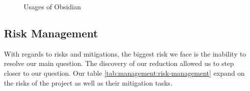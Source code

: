 \begin{figure}[h!]
    \centering
    \caption{Usages of Obsidian}
    \label{fig:theory:obsidian-usages}
\end{figure}



\subsection{Risk Management}

With regards to risks and mitigations, the biggest risk we face
is the inability to resolve our main question.
The discovery of our reduction allowed us to step closer to our question. 
Our table \ref{tab:management:risk-management} expand on the risks
of the project as well as their mitigation tasks.


